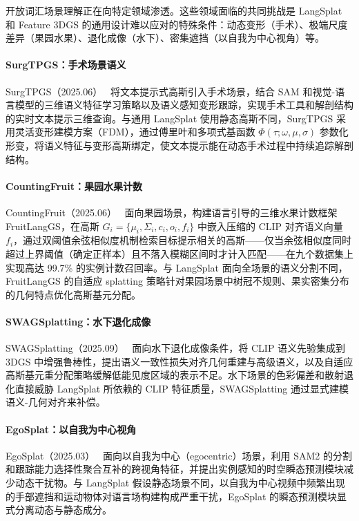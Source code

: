 开放词汇场景理解正在向特定领域渗透。这些领域面临的共同挑战是 LangSplat 和 Feature 3DGS 的通用设计难以应对的特殊条件：动态变形（手术）、极端尺度差异（果园水果）、退化成像（水下）、密集遮挡（以自我为中心视角）等。

\paragraph{SurgTPGS：手术场景语义} SurgTPGS（2025.06）~\cite{2506_23309} 将文本提示式高斯引入手术场景，结合 SAM 和视觉-语言模型的三维语义特征学习策略以及语义感知变形跟踪，实现手术工具和解剖结构的实时文本提示三维查询。与通用 LangSplat 使用静态高斯不同，SurgTPGS 采用灵活变形建模方案（FDM），通过傅里叶和多项式基函数 $\Phi(\tau; \omega, \mu, \sigma)$ 参数化形变，将语义特征与变形高斯绑定，使文本提示能在动态手术过程中持续追踪解剖结构。

\paragraph{CountingFruit：果园水果计数} CountingFruit（2025.06）~\cite{2506_01109} 面向果园场景，构建语言引导的三维水果计数框架 FruitLangGS，在高斯 $G_i = \{\mu_i, \Sigma_i, c_i, o_i, f_i\}$ 中嵌入压缩的 CLIP 对齐语义向量 $f_i$，通过双阈值余弦相似度机制检索目标提示相关的高斯——仅当余弦相似度同时超过上界阈值（确定正样本）且不落入模糊区间时才计入匹配——在九个数据集上实现高达 99.7\% 的实例计数召回率。与 LangSplat 面向全场景的语义分割不同，FruitLangGS 的自适应 splatting 策略针对果园场景中树冠不规则、果实密集分布的几何特点优化高斯基元分配。

\paragraph{SWAGSplatting：水下退化成像} SWAGSplatting（2025.09）~\cite{2509_00800} 面向水下退化成像条件，将 CLIP 语义先验集成到 3DGS 中增强鲁棒性，提出语义一致性损失对齐几何重建与高级语义，以及自适应高斯基元重分配策略缓解低能见度区域的表示不足。水下场景的色彩偏差和散射退化直接威胁 LangSplat 所依赖的 CLIP 特征质量，SWAGSplatting 通过显式建模语义-几何对齐来补偿。

\paragraph{EgoSplat：以自我为中心视角} EgoSplat（2025.03）~\cite{2503_11345} 面向以自我为中心（egocentric）场景，利用 SAM2 的分割和跟踪能力选择性聚合互补的跨视角特征，并提出实例感知的时空瞬态预测模块减少动态干扰物。与 LangSplat 假设静态场景不同，以自我为中心视频中频繁出现的手部遮挡和运动物体对语言场构建构成严重干扰，EgoSplat 的瞬态预测模块显式分离动态与静态成分。

